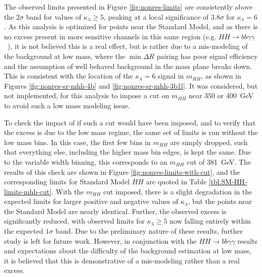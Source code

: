 The observed limits presented in Figure \ref{fig:nonres-limits} are consistently above the $2\sigma$ band for values of 
$\kappa_{\lambda} \geq 5$, peaking at a local significance of $3.8\sigma$ for $\kappa_{\lambda} = 6$. 
As this analysis is optimized for points near the Standard Model, and as there is no excess present in more 
sensitive channels in this same region (e.g. $HH\rightarrow bb\gamma\gamma$~\cite{ATLAS-CONF-2021-016}), it is 
not believed this is a real effect, but is rather due to a mis-modeling of the background at low mass, where 
the $\min{\Delta R}$ pairing 
has poor signal efficiency and the assumption of well behaved background in the mass plane breaks down. This is 
consistent with the location of the $\kappa_{\lambda} = 6$ signal in $m_{HH}$, as shown in Figures \ref{fig:nonres-sr-mhh-4b} and \ref{fig:nonres-sr-mhh-3b1l}.
It was considered, but not implemented, for this analysis to impose a cut on $m_{HH}$ near $350$ or \SI{400}{\GeV} to avoid such a low mass modeling issue.

To check the impact of if such a cut would have been imposed, and to verify that the excess is due to the low mass regime, 
the same set of limits is run without the low mass bins. In this case, the first few bins in $m_{HH}$ are simply dropped, 
such that everything else, including the higher mass bin edges, is kept the same. Due to 
the variable width binning, this corresponds to an $m_{HH}$ cut of \SI{381}{\GeV}. The results of this check are shown 
in Figure \ref{fig:nonres-limits-with-cut}, and the corresponding limits for Standard Model $HH$ are 
quoted in Table \ref{tbl:SM-HH-limits-mhh-cut}.
With the $m_{HH}$ cut imposed, there is a slight degradation in the expected limits for larger positive and negative 
values of $\kappa_{\lambda}$, but the points near the Standard Model are nearly identical. Further, the observed excess 
is significantly reduced, with observed limits for $\kappa_{\lambda} \geq 5$ now falling entirely within the expected 
$1\sigma$ band. Due to the preliminary nature of these results, further study is left for future work. However, 
in conjunction with the $HH\rightarrow bb\gamma\gamma$ results and expectations about the difficulty 
of the background estimation at low mass, it is believed that this is demonstrative of a mis-modeling rather than a real excess. 

